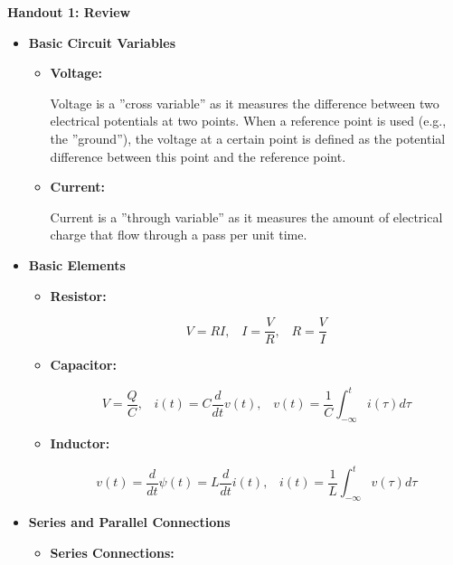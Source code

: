\usepackage{html}
\textwidth 6.0in
\topmargin -0.5in
\oddsidemargin -0in
\evensidemargin -0.5in


\begin{center}
{\huge {\bf Handout 1: Review} }
\end{center}

\begin{itemize}

\item {\bf Basic Circuit Variables}
  \begin{itemize}
    \item {\bf Voltage:}

      Voltage is a ''cross variable'' as it measures the difference between two electrical
      potentials at two points. When a reference point is used (e.g., the ''ground''), the
      voltage at a certain point is defined as the potential difference between this point
      and the reference point.

    \item {\bf Current:}

      Current is a ''through variable'' as it measures the amount of electrical charge that
      flow through a pass per unit time.

  \end{itemize}


\item {\bf Basic Elements}

  \begin{itemize}
  \item {\bf Resistor:}

    \[ V=RI,\;\;\;I=\frac{V}{R},\;\;\;R=\frac{V}{I} \]

  \item {\bf Capacitor:}

    \[ V=\frac{Q}{C}, \;\;\;i(t)=C\frac{d}{dt} v(t),\;\;\;
    v(t)=\frac{1}{C}\int_{-\infty}^t i(\tau) d\tau \]

  \item {\bf Inductor:}

    \[ v(t)=\frac{d}{dt} \psi(t)=L\frac{d}{dt} i(t),\;\;\;
    i(t)=\frac{1}{L}\int_{-\infty}^t v(\tau) d\tau \]

  \end{itemize}

\item {\bf Series and Parallel Connections}

  \begin{itemize}
  \item {\bf Series Connections:}


\end{itemize}
\end{itemize}
